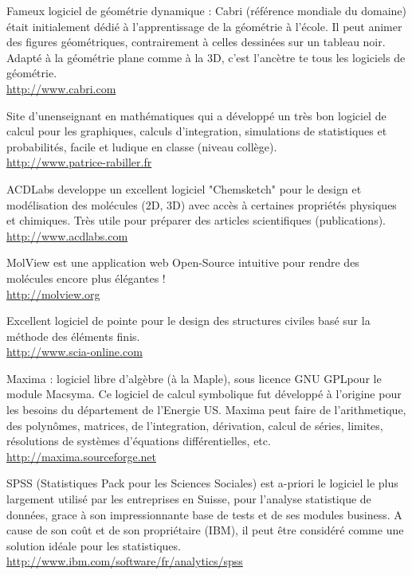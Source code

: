 	{\Large {}}{\Large {}} Fameux logiciel de géométrie dynamique : Cabri (référence mondiale du domaine) était initialement dédié à l'apprentissage de la géométrie à l'école. Il peut animer des figures géométriques, contrairement à celles dessinées sur un tableau noir. Adapté à la géométrie plane comme à la 3D, c'est l'ancètre te tous les logiciels de géométrie.\\
	\href{http://www.cabri.com}{\color{blue}http://www.cabri.com}
	
	{\Large {}}{\Large {}}{\Large {}}\bcdfrance{} Site d'unenseignant en mathématiques qui a développé un très bon logiciel de calcul pour les graphiques, calculs d'integration, simulations de statistiques et probabilités, facile et ludique en classe (niveau collège).\\
	\href{http://www.patrice-rabiller.fr}{\color{blue}http://www.patrice-rabiller.fr}
	
	{\Large {}}{\Large {}} ACDLabs developpe un excellent logiciel "Chemsketch" pour le design et modélisation des molécules (2D, 3D) avec accès à certaines propriétés physiques et chimiques. Très utile pour préparer des articles scientifiques (publications).\\
	\href{http://www.acdlabs.com}{\color{blue}http://www.acdlabs.com}
	
	{\Large {}}{\Large {}}{\Large {}} MolView est une application web Open-Source intuitive pour rendre des molécules encore plus élégantes !\\
	\href{http://molview.org}{\color{blue}http://molview.org}
	
	{\Large {}}{\Large {}} Excellent logiciel de pointe pour le design des structures civiles basé sur la méthode des éléments finis.\\
	\href{http://www.scia-online.com}{\color{blue}http://www.scia-online.com}
	
	{\Large {}}{\Large {}} Maxima : logiciel libre d'algèbre (à la Maple), sous licence GNU GPLpour le module Macsyma. Ce logiciel de calcul symbolique fut développé à l'origine pour les besoins du département de l'Energie US. Maxima peut faire de l'arithmetique, des polynômes, matrices, de l'integration, dérivation, calcul de séries, limites, résolutions de systèmes d'équations différentielles, etc.\\
	\href{http://maxima.sourceforge.net}{\color{blue}http://maxima.sourceforge.net}
	
	{\Large {}}{\Large {}} SPSS (Statistiques Pack pour les Sciences Sociales) est a-priori le logiciel le plus largement utilisé par les entreprises en Suisse, pour l'analyse statistique de données, grace à son impressionnante base de tests et de ses modules business. A cause de son coût et de son propriétaire (IBM), il peut être considéré comme une solution idéale pour les statistiques.\\
	\href{http://www.ibm.com/software/fr/analytics/spss}{\color{blue}http://www.ibm.com/software/fr/analytics/spss}
	
